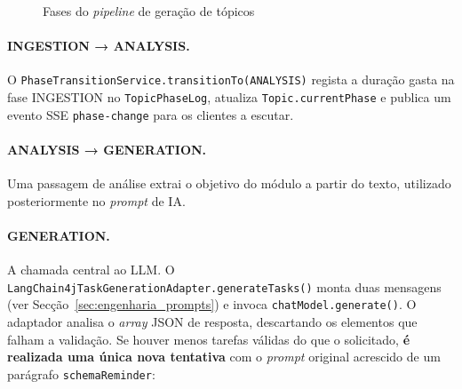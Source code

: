 \begin{figure}[htbp]
  \centering
  \caption{Fases do \textit{pipeline} de geração de tópicos}
  \label{fig:pipeline_geracao}
\end{figure}

\paragraph{INGESTION → ANALYSIS.}
O \texttt{PhaseTransitionService.transitionTo(ANALYSIS)} regista a duração
gasta na fase INGESTION no \texttt{TopicPhaseLog}, atualiza
\texttt{Topic.currentPhase} e publica um evento SSE \texttt{phase-change}
para os clientes a escutar.

\paragraph{ANALYSIS → GENERATION.}
Uma passagem de análise extrai o objetivo do módulo a partir do texto,
utilizado posteriormente no \textit{prompt} de IA.

\paragraph{GENERATION.}
A chamada central ao LLM.
O \texttt{LangChain4jTaskGenerationAdapter.generateTasks()} monta duas
mensagens (ver Secção~\ref{sec:engenharia_prompts}) e invoca
\texttt{chatModel.generate()}.
O adaptador analisa o \textit{array} JSON de resposta, descartando os
elementos que falham a validação.
Se houver menos tarefas válidas do que o solicitado, \textbf{é realizada
uma única nova tentativa} com o \textit{prompt} original acrescido de um
parágrafo \texttt{schemaReminder}:

